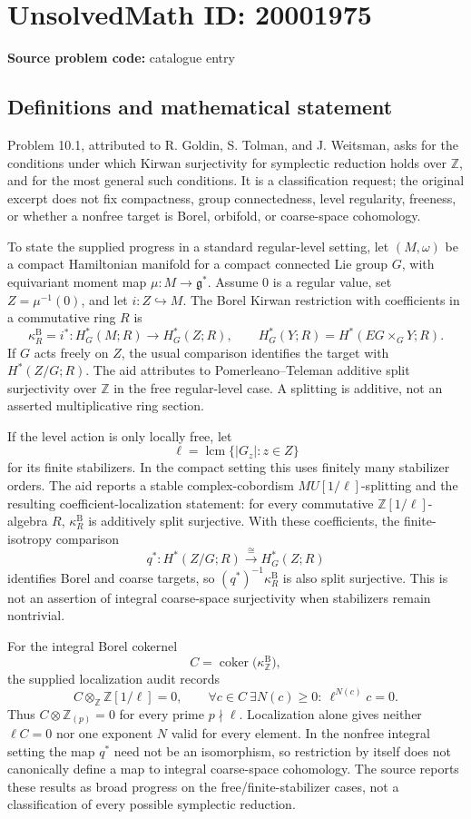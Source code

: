 \documentclass[11pt]{article}
\newcommand{\Z}{\mathbb{Z}}
\begin{document}
\section*{UnsolvedMath ID: 20001975}
\textbf{Source problem code:} catalogue entry
\subsection{Definitions and mathematical statement}
Problem 10.1, attributed to R. Goldin, S. Tolman, and J. Weitsman, asks for the conditions under which Kirwan surjectivity for symplectic reduction holds over \(\Z\), and for the most general such conditions. It is a classification request; the original excerpt does not fix compactness, group connectedness, level regularity, freeness, or whether a nonfree target is Borel, orbifold, or coarse-space cohomology.

To state the supplied progress in a standard regular-level setting, let \((M,\omega)\) be a compact Hamiltonian manifold for a compact connected Lie group \(G\), with equivariant moment map \(\mu:M\to\mathfrak g^*\). Assume \(0\) is a regular value, set \(Z=\mu^{-1}(0)\), and let \(i:Z\hookrightarrow M\). The Borel Kirwan restriction with coefficients in a commutative ring \(R\) is
\[
 \kappa_R^{\mathrm B}=i^*:H_G^*(M;R)\longrightarrow H_G^*(Z;R),\qquad
 H_G^*(Y;R)=H^*(EG\times_GY;R).
\]
If \(G\) acts freely on \(Z\), the usual comparison identifies the target with \(H^*(Z/G;R)\). The aid attributes to Pomerleano--Teleman additive split surjectivity over \(\Z\) in the free regular-level case. A splitting is additive, not an asserted multiplicative ring section.

If the level action is only locally free, let
\[
 \ell=\operatorname{lcm}\{|G_z|:z\in Z\}
\]
for its finite stabilizers. In the compact setting this uses finitely many stabilizer orders. The aid reports a stable complex-cobordism \(MU[1/\ell]\)-splitting and the resulting coefficient-localization statement: for every commutative \(\Z[1/\ell]\)-algebra \(R\), \(\kappa_R^{\mathrm B}\) is additively split surjective. With these coefficients, the finite-isotropy comparison
\[
 q^*:H^*(Z/G;R)\xrightarrow{\ \cong\ }H_G^*(Z;R)
\]
identifies Borel and coarse targets, so \((q^*)^{-1}\kappa_R^{\mathrm B}\) is also split surjective. This is not an assertion of integral coarse-space surjectivity when stabilizers remain nontrivial.

For the integral Borel cokernel
\[
 C=\operatorname{coker}\bigl(\kappa_\Z^{\mathrm B}\bigr),
\]
the supplied localization audit records
\[
 C\otimes_\Z\Z[1/\ell]=0,
 \qquad
 \forall c\in C\ \exists N(c)\ge0:\ \ell^{N(c)}c=0.
\]
Thus \(C\otimes\Z_{(p)}=0\) for every prime \(p\nmid\ell\). Localization alone gives neither \(\ell C=0\) nor one exponent \(N\) valid for every element. In the nonfree integral setting the map \(q^*\) need not be an isomorphism, so restriction by itself does not canonically define a map to integral coarse-space cohomology. The source reports these results as broad progress on the free/finite-stabilizer cases, not a classification of every possible symplectic reduction.
\end{document}
